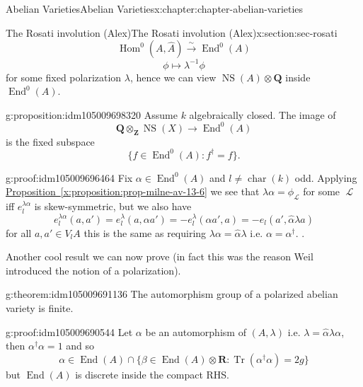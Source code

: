\documentclass[oneside,10pt,]{book}
\numberwithin{equation}{section}
\newcommand{\sheaf}[1]{\operatorname{\mathcal{#1}}}
\newcommand{\inv}{^{-1}}
\newcommand{\ZZ}{\mathbf{Z}}
\newcommand{\QQ}{\mathbf{Q}}
\newcommand{\RR}{\mathbf{R}}
\DeclareMathOperator{\End}{End}
\DeclareMathOperator{\Hom}{Hom}
\DeclareMathOperator{\characteristic}{char}
\DeclareMathOperator{\trace}{Tr}
\DeclareMathOperator{\NS}{NS}
\begin{document}
\begin{chapterptx}{Abelian Varieties}{}{Abelian Varieties}{}{}{x:chapter:chapter-abelian-varieties}
\begin{sectionptx}{The Rosati involution (Alex)}{}{The Rosati involution (Alex)}{}{}{x:section:sec-rosati}
\begin{equation*}
\Hom^0(A, \hat A) \xrightarrow{\sim} \End^0(A)
\end{equation*}
%
\begin{equation*}
\phi \mapsto \lambda\inv \phi
\end{equation*}
for some fixed polarization \(\lambda\), hence we can view \(\NS(A)\otimes \QQ\) inside \(\End^0(A)\).%
\begin{proposition}{}{}{g:proposition:idm105009698320}%
Assume \(k\) algebraically closed. The image of%
\begin{equation*}
\QQ \otimes_\ZZ \NS(X) \to \End^0(A)
\end{equation*}
is the fixed subspace%
\begin{equation*}
\{f \in \End^0(A) : f^\dagger = f\}\text{.}
\end{equation*}
%
\end{proposition}
\begin{proofptx}{}{g:proof:idm105009696464}
Fix \(\alpha \in \End^0(A)\) and \(l\ne \characteristic(k)\) odd. Applying \hyperref[x:proposition:prop-milne-av-13-6]{Proposition~\ref{x:proposition:prop-milne-av-13-6}} we see that \(\lambda \alpha = \phi_{\sheaf L}\) for some \(\sheaf L\) iff \(e^{\lambda\alpha}_l\) is skew-symmetric, but we also have%
\begin{equation*}
e_l^{\lambda\alpha}(a,a')=  e_l^{\lambda}(a,\alpha a') = -e_l^\lambda(\alpha a',a) = -e_l(a', \hat\alpha \lambda a)
\end{equation*}
for all \(a,a' \in V_lA\) this is the same as requiring \(\lambda\alpha = \hat \alpha \lambda\) i.e. \(\alpha = \alpha^\dagger\). .%
\end{proofptx}
Another cool result we can now prove (in fact this was the reason Weil introduced the notion of a polarization).%
\begin{theorem}{}{}{g:theorem:idm105009691136}%
The automorphism group of a polarized abelian variety is finite.%
\end{theorem}
\begin{proofptx}{}{g:proof:idm105009690544}
Let \(\alpha\) be an automorphism of \((A, \lambda)\) i.e. \(\lambda =\hat \alpha  \lambda \alpha\), then \(\alpha^\dagger \alpha= 1\) and so%
\begin{equation*}
\alpha \in \End(A)\cap \{\beta \in \End(A) \otimes \RR: \trace(\alpha^\dagger \alpha) = 2g\}
\end{equation*}
but \(\End(A)\) is discrete inside the compact RHS.%
\end{proofptx}
\end{sectionptx}

\end{chapterptx}
\end{document}
